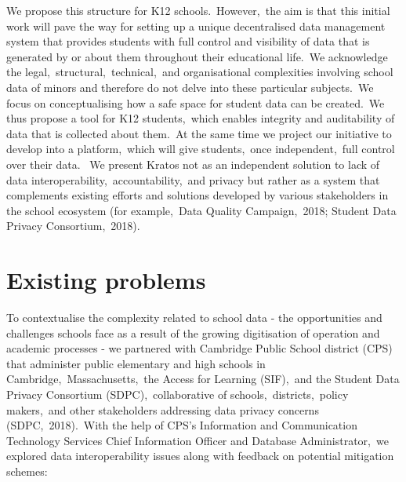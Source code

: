 \documentclass{article}
\begin{document}
\bigbreak
We propose this structure for K12 schools.\ However,\ the aim is that this initial work will pave the way for setting up a unique decentralised data management system that provides students with full control and visibility of data that is generated by or about them throughout their educational life.\ We acknowledge the legal,\ structural,\ technical,\ and organisational complexities involving school data of minors and therefore do not delve into these particular subjects.\ We focus on conceptualising how a safe space for student data can be created.\ We thus propose a tool for K12 students,\ which enables integrity and auditability of data that is collected about them.\ At the same time we project our initiative to develop into a platform,\ which will give students,\ once independent,\ full control over their data.\ 
\bigbreak
We present Kratos not as an independent solution to lack of data interoperability,\ accountability,\ and privacy but rather as a system that complements existing efforts and solutions developed by various stakeholders in the school ecosystem (for example,\ Data Quality Campaign,\ 2018; Student Data Privacy Consortium,\ 2018).

\section{Existing problems}
To contextualise the complexity related to school data - the opportunities and challenges schools face as a result of the growing digitisation of operation and academic processes - we partnered with Cambridge Public School district (CPS) that administer public elementary and high schools in Cambridge,\ Massachusetts,\ the Access for Learning (SIF),\ and the Student Data Privacy Consortium (SDPC),\ collaborative of schools,\ districts,\ policy makers,\ and other stakeholders addressing data privacy concerns (SDPC,\ 2018).\ With the help of CPS's Information and Communication Technology Services Chief Information Officer and Database Administrator,\ we explored data interoperability issues along with feedback on potential mitigation schemes:
\end{document}
